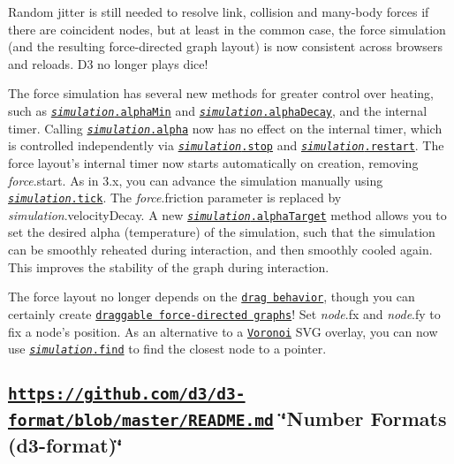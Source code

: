 Random jitter is still needed to resolve link, collision and many-\/body forces if there are coincident nodes, but at least in the common case, the force simulation (and the resulting force-\/directed graph layout) is now consistent across browsers and reloads. D3 no longer plays dice!

The force simulation has several new methods for greater control over heating, such as \href{https://github.com/d3/d3-force/blob/master/README.md#simulation_alphaMin}{\tt {\itshape simulation}.alpha\+Min} and \href{https://github.com/d3/d3-force/blob/master/README.md#simulation_alphaDecay}{\tt {\itshape simulation}.alpha\+Decay}, and the internal timer. Calling \href{https://github.com/d3/d3-force/blob/master/README.md#simulation_alpha}{\tt {\itshape simulation}.alpha} now has no effect on the internal timer, which is controlled independently via \href{https://github.com/d3/d3-force/blob/master/README.md#simulation_stop}{\tt {\itshape simulation}.stop} and \href{https://github.com/d3/d3-force/blob/master/README.md#simulation_restart}{\tt {\itshape simulation}.restart}. The force layout’s internal timer now starts automatically on creation, removing {\itshape force}.start. As in 3.\+x, you can advance the simulation manually using \href{https://github.com/d3/d3-force/blob/master/README.md#simulation_tick}{\tt {\itshape simulation}.tick}. The {\itshape force}.friction parameter is replaced by {\itshape simulation}.velocity\+Decay. A new \href{https://github.com/d3/d3-force/blob/master/README.md#simulation_alphaTarget}{\tt {\itshape simulation}.alpha\+Target} method allows you to set the desired alpha (temperature) of the simulation, such that the simulation can be smoothly reheated during interaction, and then smoothly cooled again. This improves the stability of the graph during interaction.

The force layout no longer depends on the \href{#dragging-d3-drag}{\tt drag behavior}, though you can certainly create \href{https://bl.ocks.org/mbostock/ad70335eeef6d167bc36fd3c04378048}{\tt draggable force-\/directed graphs}! Set {\itshape node}.fx and {\itshape node}.fy to fix a node’s position. As an alternative to a \href{#voronoi-d3-voronoi}{\tt Voronoi} S\+VG overlay, you can now use \href{https://github.com/d3/d3-force/blob/master/README.md#simulation_find}{\tt {\itshape simulation}.find} to find the closest node to a pointer.

\subsection*{\href{https://github.com/d3/d3-format/blob/master/README.md}{\tt https\+://github.\+com/d3/d3-\/format/blob/master/\+R\+E\+A\+D\+M\+E.\+md} \char`\"{}\+Number Formats (d3-\/format)\char`\"{}}

